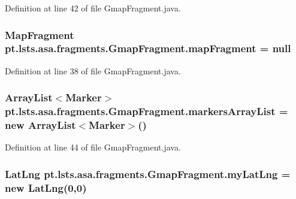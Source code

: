 Definition at line 42 of file Gmap\+Fragment.\+java.

\hypertarget{classpt_1_1lsts_1_1asa_1_1fragments_1_1GmapFragment_ad69a1fb296f59670076853cbfc6703cf}{}
\subsubsection[{map\+Fragment}]{\setlength{\rightskip}{0pt plus 5cm}Map\+Fragment pt.\+lsts.\+asa.\+fragments.\+Gmap\+Fragment.\+map\+Fragment = null\hspace{0.3cm}{\ttfamily [private]}}\label{classpt_1_1lsts_1_1asa_1_1fragments_1_1GmapFragment_ad69a1fb296f59670076853cbfc6703cf}


Definition at line 38 of file Gmap\+Fragment.\+java.

\hypertarget{classpt_1_1lsts_1_1asa_1_1fragments_1_1GmapFragment_a072003d0c8ba99401be861ddfd19f31a}{}
\subsubsection[{markers\+Array\+List}]{\setlength{\rightskip}{0pt plus 5cm}Array\+List$<$Marker$>$ pt.\+lsts.\+asa.\+fragments.\+Gmap\+Fragment.\+markers\+Array\+List = new Array\+List$<$Marker$>$()\hspace{0.3cm}{\ttfamily [private]}}\label{classpt_1_1lsts_1_1asa_1_1fragments_1_1GmapFragment_a072003d0c8ba99401be861ddfd19f31a}


Definition at line 44 of file Gmap\+Fragment.\+java.

\hypertarget{classpt_1_1lsts_1_1asa_1_1fragments_1_1GmapFragment_a5517306dfa5a0e06c006abb9b5dd908d}{}
\subsubsection[{my\+Lat\+Lng}]{\setlength{\rightskip}{0pt plus 5cm}Lat\+Lng pt.\+lsts.\+asa.\+fragments.\+Gmap\+Fragment.\+my\+Lat\+Lng = new Lat\+Lng(0,0)\hspace{0.3cm}{\ttfamily [private]}}\label{classpt_1_1lsts_1_1asa_1_1fragments_1_1GmapFragment_a5517306dfa5a0e06c006abb9b5dd908d}


